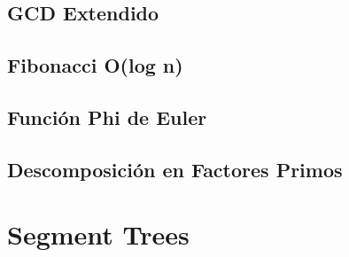 \documentclass[10pt,letterpaper,twocolumn,twosided]{article}
\newcommand{\codigofuente}[1]{

\dotfill
}
\begin{document}
\subsection{GCD Extendido}
\codigofuente{./teoria_numeros/extended_gcd.cpp}

\subsection{Fibonacci O(log n)}
\codigofuente{./teoria_numeros/fib.cpp}

\subsection{Función Phi de Euler}
\codigofuente{./teoria_numeros/phiEu.cpp}


\subsection{Descomposición en Factores Primos}
\codigofuente{./teoria_numeros/prim_factors.cpp}

\section{Segment Trees}
\codigofuente{./segment-tree/segment.cpp}
\end{document}
